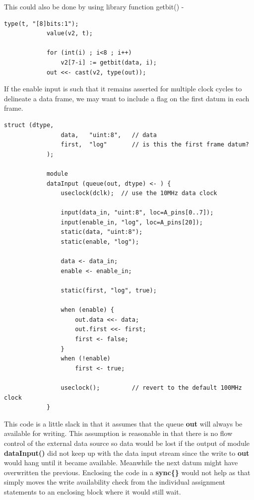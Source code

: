         This could also be done by using library function getbit() -
        \begin{lstlisting}[gobble=8, language=threepl]
            type(t, "[8]bits:1");
            value(v2, t);
            
            for (int(i) ; i<8 ; i++)
                v2[7-i] := getbit(data, i);                    
            out <<- cast(v2, type(out));
        \end{lstlisting}
        
        
        If the enable input is such that it remains asserted for multiple
        clock cycles to delineate a data frame, we may want to include a flag
        on the first datum in each frame.

        \begin{lstlisting}[gobble=8, language=threepl]
            struct (dtype,
                data,   "uint:8",   // data
                first,  "log"       // is this the first frame datum?
            );

            module
            dataInput (queue(out, dtype) <- ) {
                useclock(dclk);  // use the 10MHz data clock

                input(data_in, "uint:8", loc=A_pins[0..7]);
                input(enable_in, "log", loc=A_pins[20]);
                static(data, "uint:8");
                static(enable, "log");

                data <- data_in;
                enable <- enable_in;

                static(first, "log", true);

                when (enable) {
                    out.data <<- data;
                    out.first <<- first;
                    first <- false;
                }
                when (!enable)
                    first <- true;

                useclock();         // revert to the default 100MHz clock
            }
        \end{lstlisting}
        This code is a little slack in that it assumes that the queue {\bf out}
        will always be available for writing. This assumption is reasonable in
        that there is no flow control of the external data source so data would
        be lost if the output of module {\bf dataInput()} did not keep up with
        the data input stream since the write to {\bf out} would hang until it
        became available. Meanwhile the next datum might have overwritten the
        previous. Enclosing the code in a {\bf sync\{\}} would not help as that
        simply moves the write availability check from the individual assignment
        statements to an enclosing block where it would still wait.


